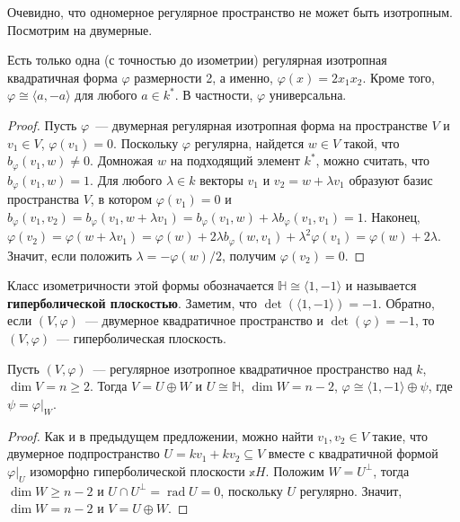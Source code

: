 \documentclass[a4paper,oneside,12pt]{article}
\theoremstyle{plain} { \swapnumbers
\newtheorem{theorem}{Теорема}[subsection]
\newtheorem{corollary}[theorem]{Следствие}
\newtheorem{lemma}[theorem]{Лемма}
\newtheorem{proposition}[theorem]{Утверждение}
\newtheorem{claim}[theorem]{Факт}
}
\theoremstyle{definition} { \swapnumbers
\newtheorem{definition}[theorem]{Определение}
\newtheorem{notation}[theorem]{Обозначение}
\newtheorem{remark}[theorem]{Замечание}
\newtheorem{remarks}[theorem]{Замечания}
\newtheorem{example}[theorem]{Пример}
\newtheorem{examples}[theorem]{Примеры}
\newtheorem{sssection}[theorem]{}
}
\def\ph{\varphi}
\def\la{\langle}
\def\ra{\rangle}
\def\rad{\operatorname{rad}}
\begin{document}
Очевидно, что одномерное регулярное пространство не может быть изотропным. Посмотрим на двумерные.
\begin{proposition}\label{prop:hyperbolic_plane}
Есть только одна (с точностью до изометрии) регулярная изотропная квадратичная форма $\ph$ размерности 2,
а именно, $\ph(x)=2x_1x_2$. Кроме того, $\ph\cong\la a,-a\ra$ для любого $a\in k^*$. В частности,
$\ph$ универсальна.
\end{proposition}
\begin{proof}
Пусть $\ph$~--- двумерная регулярная изотропная форма на пространстве $V$ и $v_1\in V$, $\ph(v_1)=0$.
Поскольку $\ph$ регулярна, найдется $w\in V$ такой, что $b_\ph(v_1,w)\neq 0$. Домножая $w$ на подходящий
элемент $k^*$, можно считать, что $b_\ph(v_1,w)=1$. Для любого $\lambda\in k$ векторы
$v_1$ и $v_2=w+\lambda v_1$ образуют базис пространства $V$, в котором $\ph(v_1)=0$
и $b_\ph(v_1,v_2)=b_\ph(v_1,w+\lambda v_1)=b_\ph(v_1,w)+\lambda b_\ph(v_1,v_1)=1$.
Наконец, $\ph(v_2)=\ph(w+\lambda v_1)=\ph(w)+2\lambda b_\ph(w,v_1)+\lambda^2\ph(v_1)=
\ph(w)+2\lambda$. Значит, если положить $\lambda=-\ph(w)/2$, получим $\ph(v_2)=0$.
\end{proof}
Класс изометричности этой формы обозначается $\mathbb H\cong\la 1,-1\ra$ и называется
{\bf гиперболической плоскостью}.
Заметим, что $\det(\la 1,-1\ra)=-1$. Обратно, если $(V,\ph)$~--- двумерное квадратичное пространство
и $\det(\ph)=-1$, то $(V,\ph)$~--- гиперболическая плоскость.
\begin{proposition}\label{prop:isotropic_contains_hyperbolic_plane}
Пусть $(V,\ph)$~--- регулярное изотропное квадратичное пространство над $k$, $\dim V=n\geq 2$. Тогда
$V=U\oplus W$ и $U\cong\mathbb H$, $\dim W=n-2$, $\ph\cong\la 1,-1\ra\oplus\psi$, где $\psi=\ph|_W$.
\end{proposition}
\begin{proof}
Как и в предыдущем предложении, можно найти $v_1,v_2\in V$ такие, что двумерное подпространство
$U=kv_1+kv_2\subseteq V$ вместе с квадратичной формой $\ph|_U$ изоморфно гиперболической плоскости $\mathbb xH$.
Положим $W=U^\perp$, тогда $\dim W\geq n-2$ и $U\cap U^\perp=\rad U=0$, поскольку $U$ регулярно.
Значит, $\dim W=n-2$ и $V=U\oplus W$.
\end{proof}
\end{document}
